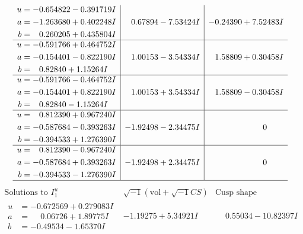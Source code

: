 \documentclass[1p]{elsarticle_modified}
\theoremstyle{definition}
\newcommand{\I}{\sqrt{-1}}
\begin{document}
$$\begin{array}{c|c|c}
\begin{aligned}
u &= -0.654822 - 0.391719 I \\
a &= -1.263680 + 0.402248 I \\
b &= \phantom{-}0.260205 + 0.435804 I\end{aligned}
 & \phantom{-}0.67894 - 7.53424 I & -0.24390 + 7.52483 I \\ \hline\begin{aligned}
u &= -0.591766 + 0.464752 I \\
a &= -0.154401 - 0.822190 I \\
b &= \phantom{-}0.82840 + 1.15264 I\end{aligned}
 & \phantom{-}1.00153 - 3.54334 I & \phantom{-}1.58809 + 0.30458 I \\ \hline\begin{aligned}
u &= -0.591766 - 0.464752 I \\
a &= -0.154401 + 0.822190 I \\
b &= \phantom{-}0.82840 - 1.15264 I\end{aligned}
 & \phantom{-}1.00153 + 3.54334 I & \phantom{-}1.58809 - 0.30458 I \\ \hline\begin{aligned}
u &= \phantom{-}0.812390 + 0.967240 I \\
a &= -0.587684 - 0.393263 I \\
b &= -0.394533 + 1.276390 I\end{aligned}
 & -1.92498 - 2.34475 I & \phantom{-0.000000 } 0 \\ \hline\begin{aligned}
u &= \phantom{-}0.812390 - 0.967240 I \\
a &= -0.587684 + 0.393263 I \\
b &= -0.394533 - 1.276390 I\end{aligned}
 & -1.92498 + 2.34475 I & \phantom{-0.000000 } 0\\
 \hline 
 \end{array}$$\newpage$$\begin{array}{c|c|c}  
\text{Solutions to }I^u_{1}& \I (\text{vol} + \sqrt{-1}CS) & \text{Cusp shape}\\
 \hline 
\begin{aligned}
u &= -0.672569 + 0.279083 I \\
a &= \phantom{-}0.06726 + 1.89775 I \\
b &= -0.49534 - 1.65370 I\end{aligned}
 & -1.19275 + 5.34921 I & \phantom{-}0.55034 - 10.82397 I \\ \hline\begin{aligned}

\end{aligned}
\end{array}$$
\end{document}
